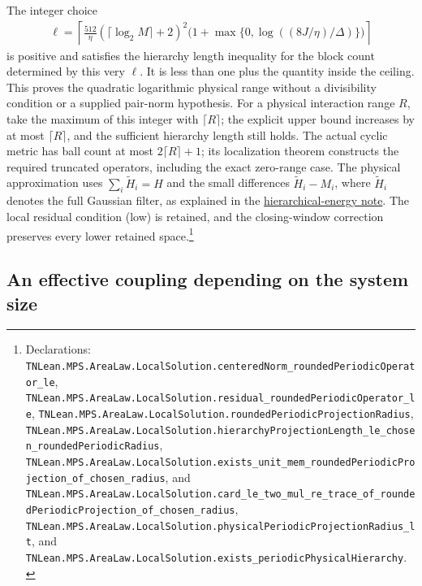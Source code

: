 \documentclass{article}
\providecommand{\leanid}[1]{\nolinkurl{#1}}
\begin{document}
The integer choice
\begin{align*}
 \ell=\left\lceil\frac{512}{\eta}(\lceil\log_2M\rceil+2)^2
      \bigl(1+\max\{0,\log((8J/\eta)/\Delta)\}\bigr)\right\rceil
\end{align*}
is positive and satisfies the hierarchy length inequality for the block
count determined by this very $\ell$. It is less than one plus the
quantity inside the ceiling. This proves the quadratic logarithmic
physical range without a divisibility condition or a supplied pair-norm
hypothesis. For a physical interaction range $R$, take the maximum of
this integer with $\lceil R\rceil$; the explicit upper bound increases
by at most $\lceil R\rceil$, and the sufficient hierarchy length still
holds. The actual cyclic metric has ball count at most $2\lceil R\rceil+1$;
its localization theorem constructs the required truncated operators,
including the exact zero-range case. The physical approximation uses
$\sum_i\widetilde H_i=H$ and the small differences
$\widetilde H_i-M_i$, where $\widetilde H_i$ denotes the full Gaussian
filter, as explained in the
\href{hastings05_hierarchical_energy.pdf}{hierarchical-energy note}.
The local residual condition (low) is retained, and the closing-window
correction preserves every lower retained space.\footnote{Declarations:
\leanid{TNLean.MPS.AreaLaw.LocalSolution.centeredNorm_roundedPeriodicOperator_le},
\leanid{TNLean.MPS.AreaLaw.LocalSolution.residual_roundedPeriodicOperator_le},
\leanid{TNLean.MPS.AreaLaw.LocalSolution.roundedPeriodicProjectionRadius},
\leanid{TNLean.MPS.AreaLaw.LocalSolution.hierarchyProjectionLength_le_chosen_roundedPeriodicRadius},
\leanid{TNLean.MPS.AreaLaw.LocalSolution.exists_unit_mem_roundedPeriodicProjection_of_chosen_radius}, and
\leanid{TNLean.MPS.AreaLaw.LocalSolution.card_le_two_mul_re_trace_of_roundedPeriodicProjection_of_chosen_radius},
\leanid{TNLean.MPS.AreaLaw.LocalSolution.physicalPeriodicProjectionRadius_lt}, and
\leanid{TNLean.MPS.AreaLaw.LocalSolution.exists_periodicPhysicalHierarchy}.}

\subsection{An effective coupling depending on the system size}
\end{document}
